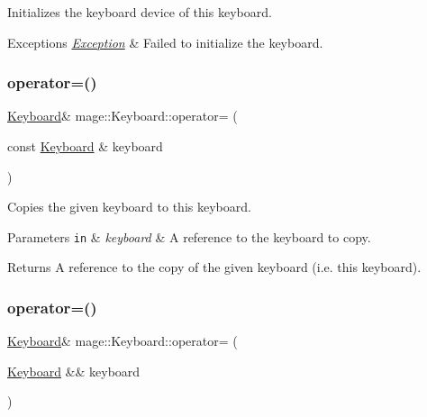 Initializes the keyboard device of this keyboard.


\begin{DoxyExceptions}{Exceptions}
{\em \hyperlink{classmage_1_1_exception}{Exception}} & Failed to initialize the keyboard. \\
\hline
\end{DoxyExceptions}
\hypertarget{classmage_1_1_keyboard_ae3ba98190c8c14ea894c676888825f35}{}\label{classmage_1_1_keyboard_ae3ba98190c8c14ea894c676888825f35} 
\subsubsection{\texorpdfstring{operator=()}{operator=()}\hspace{0.1cm}{\footnotesize\ttfamily [1/2]}}
{\footnotesize\ttfamily \hyperlink{classmage_1_1_keyboard}{Keyboard}\& mage\+::\+Keyboard\+::operator= (\begin{DoxyParamCaption}\item[{const \hyperlink{classmage_1_1_keyboard}{Keyboard} \&}]{keyboard }\end{DoxyParamCaption})\hspace{0.3cm}{\ttfamily [delete]}}

Copies the given keyboard to this keyboard.


\begin{DoxyParams}[1]{Parameters}
\mbox{\tt in}  & {\em keyboard} & A reference to the keyboard to copy. \\
\hline
\end{DoxyParams}
\begin{DoxyReturn}{Returns}
A reference to the copy of the given keyboard (i.\+e. this keyboard). 
\end{DoxyReturn}
\hypertarget{classmage_1_1_keyboard_a4f381bc90cc6828b4d0313999b544e6e}{}\label{classmage_1_1_keyboard_a4f381bc90cc6828b4d0313999b544e6e} 
\subsubsection{\texorpdfstring{operator=()}{operator=()}\hspace{0.1cm}{\footnotesize\ttfamily [2/2]}}
{\footnotesize\ttfamily \hyperlink{classmage_1_1_keyboard}{Keyboard}\& mage\+::\+Keyboard\+::operator= (\begin{DoxyParamCaption}\item[{\hyperlink{classmage_1_1_keyboard}{Keyboard} \&\&}]{keyboard }\end{DoxyParamCaption})\hspace{0.3cm}{\ttfamily [delete]}}


